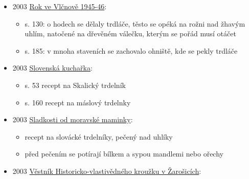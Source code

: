 \begin{itemize}
  \begin{itemize}
  \tightlist
  \item
    s. 253 - svatba, na námluvách u rodiny nevěsty na přivítanou dávali
    vdolečky nebo trdláče
  \item
    s. 263 - snídaně u ženicha, dostávají vdolečky nebo trdláče
  \item
    s. 332 - k obědu bývaly trdláče pečené na trdelníku na ohništi nad
    ohněm

    \begin{itemize}
    \tightlist
    \item
      trdláče téměř vymizely v první polovině 20. století kvůli vymizení
      ohnišť z chalup
    \end{itemize}
  \end{itemize}
\item
  2003
  \href{https://ceskadigitalniknihovna.cz/uuid/uuid:72938430-ef5f-11e5-bdc9-005056827e52}{Rok
  ve Vlčnově 1945-46}:

  \begin{itemize}
  \tightlist
  \item
    s. 130: o hodech se dělaly trdláče, těsto se opéká na rožni nad
    žhavým uhlím, natočené na dřevěném válečku, kterým se pořád musí
    otáčet
  \item
    s. 185: v mnoha staveních se zachovalo ohniště, kde se pekly trdláče
  \end{itemize}
\item
  2003
  \href{https://ceskadigitalniknihovna.cz/view/uuid:b004cc10-6352-11e4-b42a-005056827e52?page=uuid\%3A70d8a160-6799-11e4-8fe2-5ef3fc9bb22f&fulltext=trdeln\%C3\%ADk\%20OR\%20trdeln\%C3\%ADky\%20OR\%20trdeln\%C3\%ADk\%C5\%AF&source=mzk}{Slovenská
  kuchařka}:

  \begin{itemize}
  \tightlist
  \item
    s. 53 recept na Skalický trdelník
  \item
    s. 160 recept na máslový trdelnky
  \end{itemize}
\item
  2003
  \href{https://ceskadigitalniknihovna.cz/view/uuid:cdea10f0-f64a-11e5-8d5f-005056827e51?page=uuid\%3A866b8a90-2194-11e6-8145-5ef3fc9bb22f&fulltext=trdeln\%C3\%ADk\%20OR\%20trdeln\%C3\%ADky\%20OR\%20trdeln\%C3\%ADk\%C5\%AF&source=mzk}{Sladkosti
  od moravské maminky}:

  \begin{itemize}
  \tightlist
  \item
    recept na slovácké trdelníky, pečený nad uhlíky
  \item
    před pečením se potírají bílkem a sypou mandlemi nebo ořechy
  \end{itemize}
\item
  2003
  \href{https://ceskadigitalniknihovna.cz/uuid/uuid:d6ed8ce0-451c-11e3-9c86-005056827e51}{Věstník
  Historicko-vlastivědného kroužku v Žarošicích}:


\end{itemize}
